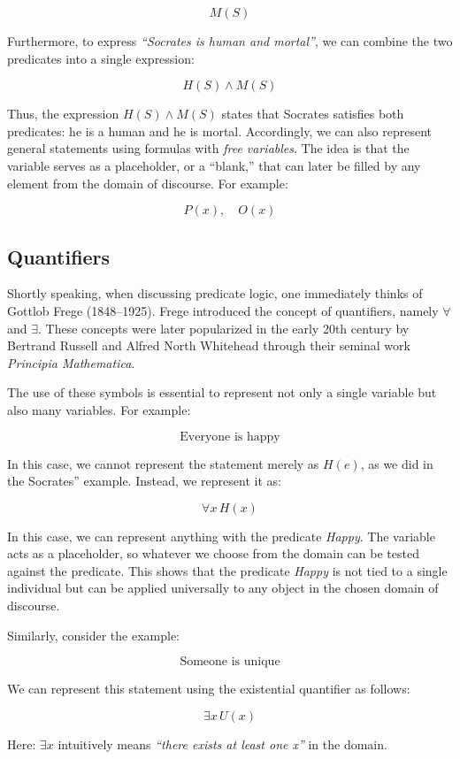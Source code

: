 \documentclass[12pt,a4paper,openany]{article}
\begin{document}
\[M(S)\]

Furthermore, to express \emph{``Socrates is human and mortal''}, we can
combine the two predicates into a single expression:

\[ H(S) \land M(S) \]

Thus, the expression \(H(S) \land M(S)\) states that Socrates satisfies
both predicates: he is a human and he is mortal. Accordingly, we can
also represent general statements using formulas with \emph{free
variables}. The idea is that the variable serves as a placeholder, or a
``blank,'' that can later be filled by any element from the domain of
discourse. For example:

\[ P(x), \quad O(x)\]

\subsection{Quantifiers}\label{quantifiers}

Shortly speaking, when discussing predicate logic, one immediately
thinks of Gottlob Frege (1848--1925). Frege introduced the concept of
quantifiers, namely \(\forall\) and \(\exists\). These concepts were
later popularized in the early 20th century by Bertrand Russell and
Alfred North Whitehead through their seminal work \emph{Principia
Mathematica}.

The use of these symbols is essential to represent not only a single
variable but also many variables. For example:

\[\text{Everyone is happy}\]

In this case, we cannot represent the statement merely as \(H(e)\), as
we did in the Socrates'' example. Instead, we represent it as:

\[\forall x \, H(x)\]

In this case, we can represent anything with the predicate \emph{Happy}.
The variable acts as a placeholder, so whatever we choose from the
domain can be tested against the predicate. This shows that the
predicate \emph{Happy} is not tied to a single individual but can be
applied universally to any object in the chosen domain of discourse.

Similarly, consider the example:

\[\text{Someone is unique}\]

We can represent this statement using the existential quantifier as
follows:

\[\exists x \, U(x)\]

Here:  \(\exists x\) intuitively means \emph{``there exists at least
one x''} in the domain.
\end{document}
